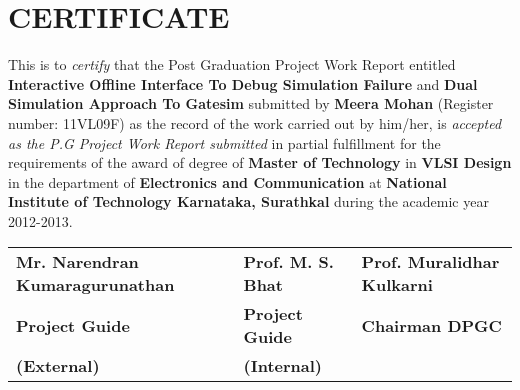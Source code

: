 \section*{\centering CERTIFICATE}
This is to \emph{certify} that the Post Graduation Project Work Report entitled 
{\bf Interactive Offline Interface To Debug Simulation Failure} and {\bf Dual Simulation Approach To Gatesim} 
submitted by {\bf Meera Mohan} (Register number: 11VL09F) as the 
record of the work carried out by him/her, is \emph{accepted as the  
P.G Project Work Report submitted} in partial fulfillment for 
the requirements of the award of degree of {\bf Master of Technology} 
in {\bf VLSI Design} in the department of {\bf Electronics and Communication} 
at {\bf National Institute of Technology Karnataka, Surathkal} during the 
academic year 2012-2013.

\vspace{1.4in}

 \begin{tabular}{lll}
 \hspace{-1cm}\bf{Mr. Narendran Kumaragurunathan}	&\hspace{.7cm}\bf{Prof. M. S. Bhat}	 &\hspace{.7cm}\bf{Prof. Muralidhar Kulkarni}	\\
 \hspace{-1cm}\bf{Project Guide} &\hspace{.7cm}\bf{Project Guide}		&\hspace{.7cm}\bf{Chairman DPGC}\\
 \hspace{-.7cm}\bf{(External)}   	&\hspace{0.25in}\bf{(Internal)}\\

 \end{tabular}







